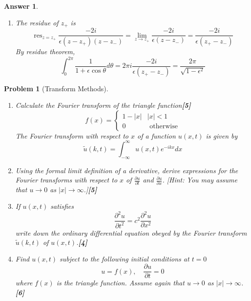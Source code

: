 \documentclass[a4paper]{article}
\DeclareMathOperator{\res}{res}
\newtheorem{ans}{Answer}[section]
\theoremstyle{new}
\newtheorem{qns}{Problem}[section]
\begin{document}
\begin{ans}
\begin{enumerate}[label=(\roman*)]
\begin{enumerate}[label=(\alph*)]
\begin{center}
  \end{center}
\item The residue of $z_+$ is
$$\res_{z=z_+}\frac{-2i}{\epsilon(z-z_+)(z-z_-)}=\lim_{z\rightarrow z_+}\frac{-2i}{\epsilon(z-z_-)}=\frac{-2i}{\epsilon(z_+-z_-)}$$
By residue theorem,
$$\int_0^{2\pi}\frac{1}{1+\epsilon\cos\theta}d\theta=2\pi i\frac{-2i}{\epsilon(z_+-z_-)}=\frac{2\pi}{\sqrt{1-\epsilon^2}}$$
\end{enumerate}
\end{enumerate}
\end{ans}
\newpage
\begin{qns}[Transform Methods]\leavevmode
\begin{enumerate}[label=(\roman*)]
\item Calculate the Fourier transform of the triangle function\hfill\textbf{[5]}
\begin{equation}
   f(x)=
\left\{
        \begin{array}{ll}
      1-|x| & |x|<1 \\
      0 & \text{ otherwise}
        \end{array}
    \right.\tag{*} 
\end{equation}
The Fourier transform with respect to $x$ of a function $u(x, t)$ is given by
$$\tilde{u}(k,t)=\int_{-\infty}^\infty u(x,t)e^{-ikx}dx$$
\item Using the formal limit definition of a derivative, derive expressions for the Fourier transforms with respect to $x$ of $\frac{\partial u}{\partial t}$ and $\frac{\partial u}{\partial x}$. [Hint: You may assume that $u\rightarrow 0$ as $|x|\rightarrow\infty$.]\hfill\textbf{[5]}
\item If $u(x, t)$ satisfies
$$\frac{\partial^2u}{\partial t^2}=c^2\frac{\partial^2u}{\partial x^2}$$
write down the ordinary differential equation obeyed by the Fourier transform $\tilde{u}(k,t)$ of $u(x, t)$.\hfill\textbf{[4]}
\item Find $u(x, t)$ subject to the following initial conditions at $t = 0$
$$u=f(x),\quad \frac{\partial u}{\partial t}=0$$
where $f(x)$ is the triangle function. Assume again that $u\rightarrow 0$ as $|x|\rightarrow\infty$.\hfill\textbf{[6]}
\end{enumerate}
\end{qns}
\end{document}
